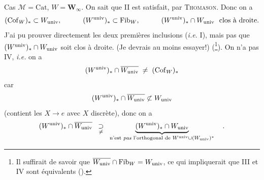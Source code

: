 \clearpage
{}

\noindent Cas $\mathcal{M} = \mathrm{Cat}$, $W = \mathbf{W}_\infty$. On sait que II est satisfait, par \textsc{Thomason}. Donc on a
\[
(\mathrm{Cof}_W)_* \subset W_{\mathrm{univ}}, \qquad\quad (W^{\mathrm{univ}})_* \subset \mathrm{Fib}_W, \qquad\quad (W^{\mathrm{univ}})_* \cap W_{\mathrm{univ}} \ \text{ clos à droite.}
\]
J'ai pu prouver directement les deux premières inclusions (\textit{i.e.} I), mais pas que $(W^{\mathrm{univ}})_* \cap W_{\mathrm{univ}}$ soit clos à droite. (Je devrais au moins essayer!) (\footnote[18]{Il suffirait de savoir que $\overline{W_{\mathrm{univ}}} \cap \mathrm{Fib}_W = W_{\mathrm{univ}}$, ce qui impliquerait que III et IV sont équivalents (\footnotemark[19]).}). On n'a pas IV, \textit{i.e.} on a
\[
(W^{\mathrm{univ}})_* \cap \overline{W_{\mathrm{univ}}} \;\neq\; (\mathrm{Cof}_W)_*
\]
car
\[
(W^{\mathrm{univ}})_* \cap \overline{W_{\mathrm{univ}}} \not\subset W_{\mathrm{univ}}
\]
(contient les $X \longrightarrow e$ avec $X$ discrète), donc on a
\[
(W^{\univ})_* \cap \overline{W_{\univ}} \;\;\underset{\neq}{\supset}\;\; \underbrace{(W^{\univ})_* \cap W_{\univ}}_{\text{n'est \textit{pas} l'orthogonal de } W^{\univ} \cup (W_{\univ})^*} \quad . %
\]


